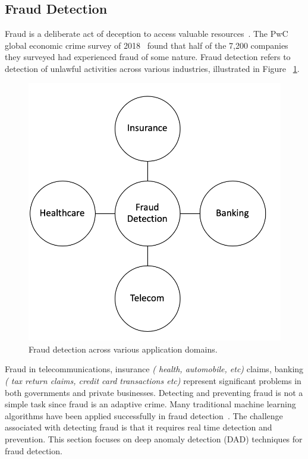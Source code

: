 \subsection{Fraud Detection}
Fraud is a deliberate act of deception to access valuable resources~\cite{abdallah2016fraud}. The PwC global economic crime survey of 2018~\cite{Lavion2018,zhao2013fraud} found that half of the 7,200 companies they surveyed had experienced fraud of some nature. Fraud detection refers to detection of unlawful activities across various industries, illustrated in Figure ~\ref{fig:AerasOfFraud}.

\begin{figure}[h]
\centering
\includegraphics[scale=0.5]{images/AreasOfFraud}
\captionsetup{justification=centering}
\caption{Fraud detection across various application domains.}
\label{fig:AerasOfFraud}
\end{figure}

Fraud in telecommunications, insurance \textit{( health, automobile, etc)} claims, banking \textit{( tax return claims, credit card transactions etc)} represent significant problems in both governments and private businesses. Detecting and preventing fraud is not a simple task since fraud is an adaptive crime. Many traditional machine learning algorithms have been applied successfully in fraud detection~\cite{sorournejad2016survey}.  The challenge associated with detecting fraud is that it requires real time detection and prevention. This section focuses on deep anomaly detection (DAD) techniques for fraud detection.

